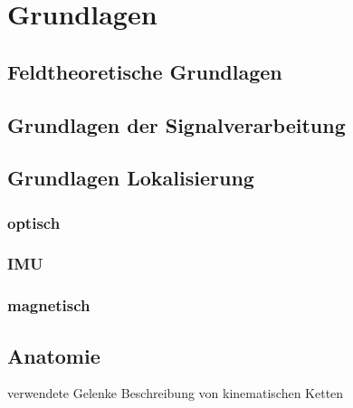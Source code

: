 \chapter{Grundlagen}
\label{chap:grundlagen}
\section{Feldtheoretische Grundlagen}
\label{sec:grund_field}
\section{Grundlagen der Signalverarbeitung}
\label{sec:grund_Sig}
\subsection{}
	
\section{Grundlagen Lokalisierung}
\label{sec:GrundlagenLokalisierung}

\subsection{optisch}
\subsection{IMU}
\subsection{magnetisch}

\section{Anatomie}
verwendete Gelenke 
Beschreibung von kinematischen Ketten
      
      